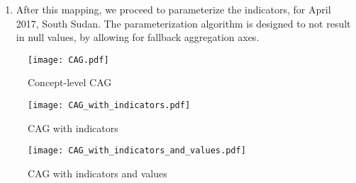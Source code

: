 \documentclass{apnotes}
\begin{document}
\begin{enumerate}
\item After this mapping, we proceed to parameterize the indicators, for April
  2017, South Sudan. The parameterization algorithm is designed to not result in
  null values, by allowing for fallback aggregation axes.
\end{enumerate}

\begin{figure}
  \centering
  \texttt{[image: CAG.pdf]}
  \caption{Concept-level CAG}
  \label{fig:precipitation_centered_cag}
\end{figure}

\begin{figure}
  \centering
  \texttt{[image: CAG\_with\_indicators.pdf]}
  \caption{CAG with indicators}
\end{figure}

\begin{figure}
  \centering
  \texttt{[image: CAG\_with\_indicators\_and\_values.pdf]}
  \caption{CAG with indicators and values}
\end{figure}

\end{document}
